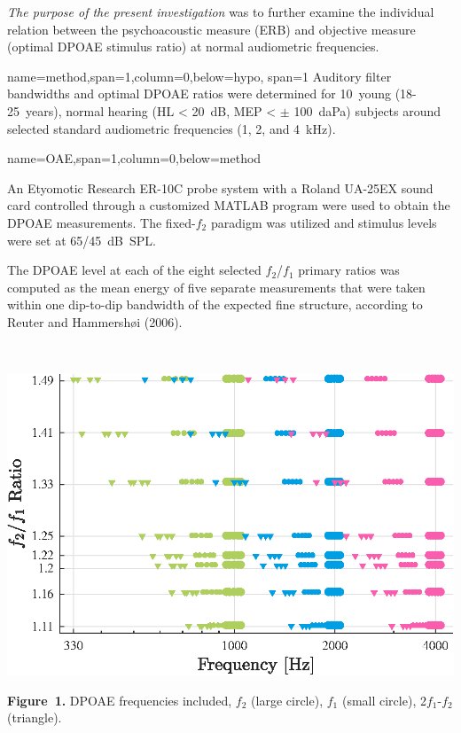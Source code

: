 \documentclass[paperwidth=100cm,paperheight=160cm,portrait,fontscale=0.2941]{baposter}
\begin{document}
\begin{poster}
{\textit{The purpose of the present investigation} was to further examine the individual relation between the psychoacoustic measure (ERB) and objective measure (optimal DPOAE stimulus ratio) at normal audiometric frequencies.
}

{name=method,span=1,column=0,below=hypo, span=1}
{\parskip 5pt 
Auditory filter bandwidths and optimal DPOAE ratios were determined for 10~young (18-25~years), normal hearing (HL < 20~dB, MEP < $\pm$ 100~daPa) subjects around selected standard audiometric frequencies (1, 2, and 4~kHz).}


{name=OAE,span=1,column=0,below=method}
{\parskip 5pt 
An Etyomotic Research ER-10C probe system with a Roland UA-25EX sound card controlled through a customized MATLAB program were used to obtain the DPOAE measurements. The fixed-$f_2$ paradigm was utilized and stimulus levels were set at 65/45~dB~SPL. 


The DPOAE level at each of the eight selected $f_2$/$f_1$ primary ratios was computed as the mean energy of five separate measurements that were taken within one dip-to-dip bandwidth of the expected fine structure, according to Reuter and Hammershøi (2006).

~

    \begin{flushright}
    \includegraphics[width=0.95\linewidth]{RatioShow.eps}
    \end{flushright}
\vspace{-10pt}

    \textbf{Figure~1.} DPOAE frequencies included, $f_2$ (large circle), $f_1$ (small circle), 2$f_1$-$f_2$ (triangle).

}


\end{poster}
\end{document}
